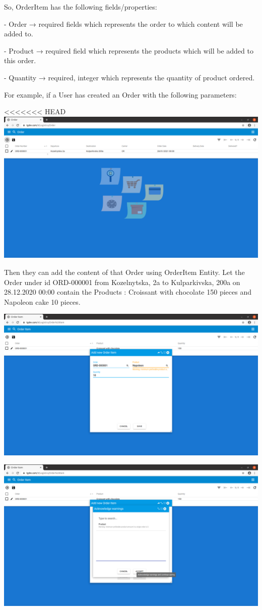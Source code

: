 So, OrderItem has the following fields/properties:


- Order →  required fields which represents the order to which content will be added to.

- Product →  required field which represents the products which will be added to this order.

- Quantity →  required, integer which represents the quantity of product ordered.


For example, if a User has created an Order with the following parameters:

<<<<<<< HEAD
\includegraphics[width=\textwidth]{sections/01-chapter/images/order13.png}

Then they can add the content of that Order using OrderItem Entity. Let the Order under id ORD-000001 from Kozelnytska, 2a to Kulparkivska, 200a on 28.12.2020 00:00 contain the Products : Croissant with chocolate 150  pieces and Napoleon cake 10 pieces. 

\includegraphics[width=\textwidth]{sections/01-chapter/images/orderitem12.png}


\includegraphics[width=\textwidth]{sections/01-chapter/images/orderitem13.png}


